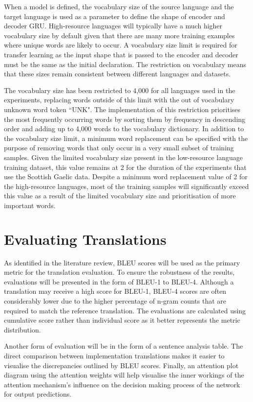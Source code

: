 %
When a model is defined, the vocabulary size of the source language and the target language is used as a parameter to define the shape of encoder and decoder \acrshort{GRU}. High-resource languages will typically have a much higher vocabulary size by default given that there are many more training examples where unique words are likely to occur. A vocabulary size limit is required for transfer learning as the input shape that is passed to the encoder and decoder must be the same as the initial declaration. The restriction on vocabulary means that these sizes remain consistent between different languages and datasets.

The vocabulary size has been restricted to 4,000 for all languages used in the experiments, replacing words outside of this limit with the out of vocabulary unknown word token ``UNK". The implementation of this restriction prioritises the most frequently occurring words by sorting them by frequency in descending order and adding up to 4,000 words to the vocabulary dictionary.
In addition to the vocabulary size limit, a minimum word replacement can be specified with the purpose of removing words that only occur in a very small subset of training samples. Given the limited vocabulary size present in the low-resource language training dataset, this value remains at 2 for the duration of the experiments that use the Scottish Gaelic data. Despite a minimum word replacement value of 2 for the high-resource languages, most of the training samples will significantly exceed this value as a result of the limited vocabulary size and prioritisation of more important words.



\section{Evaluating Translations}
\label{sec:3-evaluating}

As identified in the literature review, \acrshort{BLEU} scores will be used as the primary metric for the translation evaluation. To ensure the robustness of the results, evaluations will be presented in the form of \acrshort{BLEU}-1 to \acrshort{BLEU}-4. Although a translation may receive a high score for \acrshort{BLEU}-1, \acrshort{BLEU}-4 scores are often considerably lower due to the higher percentage of n-gram counts that are required to match the reference translation. The evaluations are calculated using cumulative score rather than individual score as it better represents the metric distribution. 

Another form of evaluation will be in the form of a sentence analysis table. The direct comparison between implementation translations makes it easier to visualise the discrepancies outlined by \acrshort{BLEU} scores.
Finally, an attention plot diagram using the attention weights will help visualise the inner workings of the attention mechanism's influence on the decision making process of the network for output predictions. 

